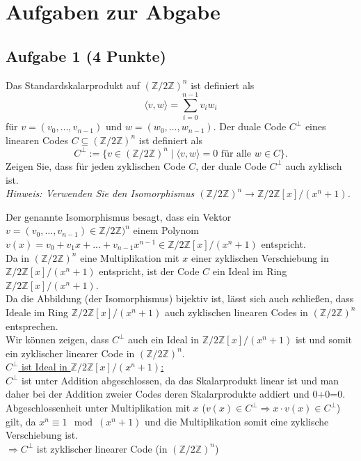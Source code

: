 \documentclass{article} %
\begin{document}
\section*{Aufgaben zur Abgabe}

\subsection*{Aufgabe 1 (4 Punkte)}  
Das Standardskalarprodukt auf $(\mathbb{Z}/2\mathbb{Z})^n$ ist definiert als
\[
\langle v, w \rangle = \sum_{i=0}^{n-1} v_i w_i
\]
für $v = (v_0, \dots, v_{n-1})$ und $w = (w_0, \dots, w_{n-1})$. Der duale Code $C^\perp$ eines linearen Codes $C \subseteq (\mathbb{Z}/2\mathbb{Z})^n$ ist definiert als
\[
C^\perp := \{v \in (\mathbb{Z}/2\mathbb{Z})^n \mid \langle v, w \rangle = 0 \text{ für alle } w \in C\}.
\]
Zeigen Sie, dass für jeden zyklischen Code $C$, der duale Code $C^\perp$ auch zyklisch ist.   \\
\textit{Hinweis: Verwenden Sie den Isomorphismus $(\mathbb{Z}/2\mathbb{Z})^n \to \mathbb{Z}/2\mathbb{Z}[x]/(x^n + 1)$.}
\begin{mybox}
Der genannte Isomorphismus besagt, dass ein Vektor  $v = (v_0, \dots, v_{n-1}) \in \mathbb{Z}/2\mathbb{Z})^n $ einem Polynom $v(x)=v_0+v_1x+...+v_{n-1}x^{n-1} \in \mathbb{Z}/2\mathbb{Z}[x]/(x^n + 1)$ entspricht. \\
Da in $(\mathbb{Z}/2\mathbb{Z})^n$ eine Multiplikation mit $x$ einer zyklischen Verschiebung in $\mathbb{Z}/2\mathbb{Z}[x]/(x^n + 1)$ entspricht, ist der Code $C$ ein Ideal im Ring $\mathbb{Z}/2\mathbb{Z}[x]/(x^n + 1)$. \\
Da die Abbildung (der Isomorphismus) bijektiv ist, lässt sich auch schließen, dass Ideale im Ring $\mathbb{Z}/2\mathbb{Z}[x]/(x^n + 1)$ auch zyklischen linearen Codes in $(\mathbb{Z}/2\mathbb{Z})^n$ entsprechen. \\
Wir können zeigen, dass  $C^\perp$ auch ein Ideal in $\mathbb{Z}/2\mathbb{Z}[x]/(x^n + 1)$ ist und somit ein zyklischer linearer Code in $(\mathbb{Z}/2\mathbb{Z})^n$. \\
\underline{$C^\perp$ ist Ideal in $\mathbb{Z}/2\mathbb{Z}[x]/(x^n + 1)$:} \\
$C^\perp$ ist unter Addition abgeschlossen, da das Skalarprodukt linear ist und man daher bei der Addition zweier Codes deren Skalarprodukte addiert und 0+0=0. \\
Abgeschlossenheit unter Multiplikation mit $x$ ($v(x) \in C^\perp \Rightarrow x\cdot v(x) \in C^\perp$) gilt, da $x^n\equiv 1\mod(x^n+1)$ und die Multiplikation somit eine zyklische Verschiebung ist. \\ \newline
$\Rightarrow C^\perp$ ist zyklischer linearer Code (in $(\mathbb{Z}/2\mathbb{Z})^n$)

\end{mybox} 
\end{document}
